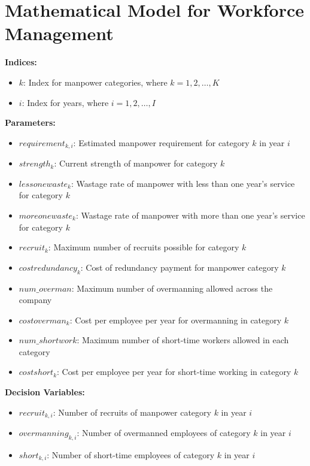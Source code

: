 \documentclass{article}
\begin{document}
\section*{Mathematical Model for Workforce Management}

\textbf{Indices:} \\
\begin{itemize}
    \item $k$: Index for manpower categories, where $k = 1, 2, \ldots, K$ 
    \item $i$: Index for years, where $i = 1, 2, \ldots, I$
\end{itemize}

\textbf{Parameters:} \\
\begin{itemize}
    \item $requirement_{k,i}$: Estimated manpower requirement for category $k$ in year $i$
    \item $strength_k$: Current strength of manpower for category $k$
    \item $lessonewaste_k$: Wastage rate of manpower with less than one year's service for category $k$
    \item $moreonewaste_k$: Wastage rate of manpower with more than one year's service for category $k$
    \item $recruit_k$: Maximum number of recruits possible for category $k$
    \item $costredundancy_k$: Cost of redundancy payment for manpower category $k$
    \item $num\_overman$: Maximum number of overmanning allowed across the company
    \item $costoverman_k$: Cost per employee per year for overmanning in category $k$
    \item $num\_shortwork$: Maximum number of short-time workers allowed in each category
    \item $costshort_k$: Cost per employee per year for short-time working in category $k$
\end{itemize}

\textbf{Decision Variables:} \\
\begin{itemize}
    \item $recruit_{k,i}$: Number of recruits of manpower category $k$ in year $i$
    \item $overmanning_{k,i}$: Number of overmanned employees of category $k$ in year $i$
    \item $short_{k,i}$: Number of short-time employees of category $k$ in year $i$
\end{itemize}
\end{document}
